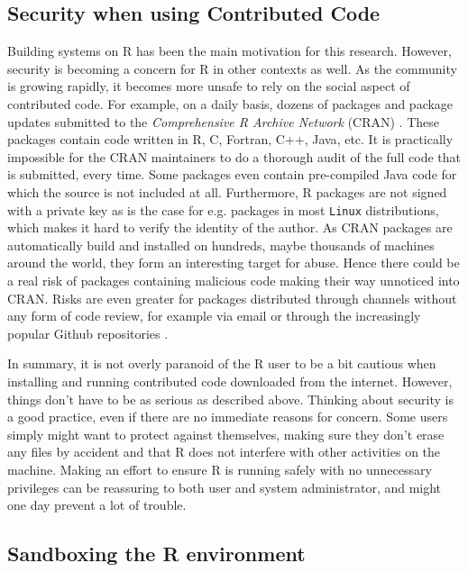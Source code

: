 \documentclass[article]{jss}
\newcommand{\R}{\textsf{R}\xspace}
\newcommand{\Java}{\textsf{Java}\xspace}
\newcommand{\C}{\textsf{C}\xspace}
\newcommand{\Cpp}{\textsf{C++}\xspace}
\newcommand{\Fortran}{\textsf{Fortran}\xspace}
\newcommand{\Linux}{\texttt{Linux}\xspace}
\begin{document}
\subsection{Security when using Contributed Code}


Building systems on \R has been the main motivation for this research.
However, security is becoming a concern for \R in other contexts as
well. As the community is growing rapidly, it becomes more unsafe
to rely on the social aspect of contributed code. For example, on a daily
basis, dozens of packages and package updates submitted to the
\emph{Comprehensive R Archive Network} (CRAN) \citep{ripleycran}.
These packages contain code written in \R, \C, \Fortran, \Cpp, \Java, etc. It
is practically impossible for the CRAN maintainers to do a thorough audit of the
full code that is submitted, every time. Some packages even contain pre-compiled \Java code for which the source is not included at all. Furthermore, \R packages
are not signed with a private key as is the case for e.g. packages in most
\Linux distributions, which makes it hard to verify the identity of the author. As
CRAN packages are automatically build and installed on hundreds, maybe thousands
of machines around the world, they form an interesting target for abuse.
Hence there could be a real risk of packages containing malicious code making
their way unnoticed into CRAN. Risks are even greater for packages 
distributed through channels without any form of code review, for example via
email or through the increasingly popular Github repositories
\citep{torvalds2006git,dabbish2012social}.

In summary, it is not overly paranoid of the \R user to be a bit
cautious when installing and running contributed code downloaded from the
internet. However, things don't have to be as serious as described above.
Thinking about security is a good practice, even if there are no immediate reasons
for concern. Some users simply might want to protect against themselves, making
sure they don't erase any files by accident and that \R does not
interfere with other activities on the machine. Making an effort to ensure
\R is running safely with no unnecessary privileges can be reassuring 
to both user and system administrator, and might one day prevent a lot of trouble.

\subsection{Sandboxing the R environment}
\end{document}
